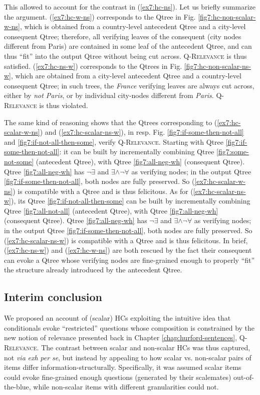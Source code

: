 This allowed to account for the contrast in (\ref{ex7:hc-ns}). Let us briefly summarize the argument. (\ref{ex7:hc-w-ns}) corresponds to the Qtree in Fig. \ref{fig7:hc-non-scalar-w-ns}, which is obtained from a country-level antecedent Qtree and a city-level consequent Qtree; therefore, all verifying leaves of the consequent (city nodes different from Paris) are contained in some leaf of the antecedent Qtree, and can thus ``fit'' into the output Qtree without being cut across. \textsc{Q-Relevance} is thus satisfied.  (\ref{ex7:hc-ns-w}) corresponds to the Qtrees in Fig. \ref{fig7:hc-non-scalar-ns-w}, which are obtained from a city-level antecedent Qtree and a country-level consequent Qtree; in such trees, the \textit{France} verifying leaves are always cut across, either by \textit{not Paris}, or by individual city-nodes different from \textit{Paris}. \textsc{Q-Relevance} is thus violated.

The same kind of reasoning shows that the Qtrees corresponding to (\ref{ex7:hc-scalar-w-ns}) and (\ref{ex7:hc-scalar-ns-w}), in resp. Fig. \ref{fig7:if-some-then-not-all} and \ref{fig7:if-not-all-then-some}, verify \textsc{Q-Relevance}. Starting with Qtree \ref{fig7:if-some-then-not-all}: it can be built by incrementally combining  Qtree \ref{fig7:some-not-some} (antecedent Qtree), with Qtree \ref{fig7:all-neg-wh} (consequent Qtree). Qtree \ref{fig7:all-neg-wh} has $\neg\exists$ and $\exists\wedge\neg\forall$ as verifying nodes; in the output Qtree \ref{fig7:if-some-then-not-all}, both nodes are fully preserved. So (\ref{ex7:hc-scalar-w-ns}) is compatible with a Qtree and is thus felicitous. As for (\ref{ex7:hc-scalar-ns-w}), its Qtree \ref{fig7:if-not-all-then-some} can be built by incrementally combining  Qtree \ref{fig7:all-not-all} (antecedent Qtree), with Qtree \ref{fig7:all-neg-wh} (consequent Qtree). Qtree \ref{fig7:all-neg-wh} has $\neg\exists$ and $\exists\wedge\neg\forall$ as verifying nodes; in the output Qtree \ref{fig7:if-some-then-not-all}, both nodes are fully preserved. So (\ref{ex7:hc-scalar-ns-w}) is compatible with a Qtree and is thus felicitous. In brief, (\ref{ex7:hc-ns-w}) and (\ref{ex7:hc-w-ns}) are both rescued by the fact their consequent can evoke a Qtree whose verifying nodes are fine-grained enough to properly ``fit'' the structure already introduced by the antecedent Qtree.


\subsection{Interim conclusion}
We proposed an account of (scalar) HCs exploiting the intuitive idea that conditionals evoke ``restricted'' questions whose composition is constrained by the new notion of relevance presented back in Chapter \ref{chap:hurford-sentences}, \textsc{Q-Relevance}. The contrast between scalar and non-scalar HCs was thus captured, not \textit{via} \textit{exh} \textit{per se}, but instead by appealing to how scalar vs. non-scalar pairs of items differ information-structurally. Specifically, it was assumed scalar items could evoke fine-grained enough questions (generated by their scalemates) out-of-the-blue, while non-scalar items with different granularities could not.\\


